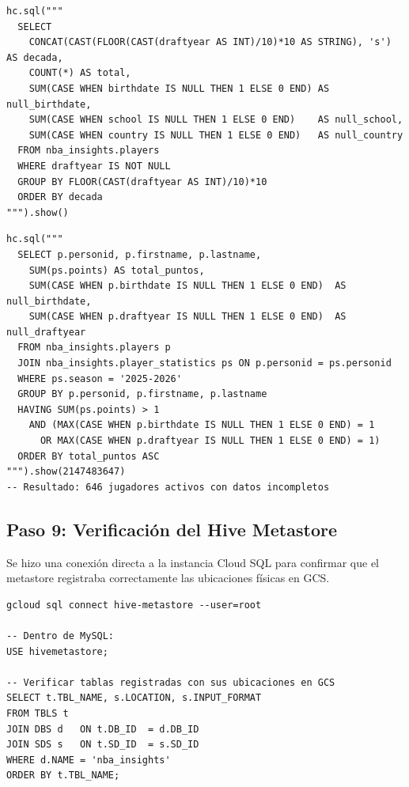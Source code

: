 \documentclass[12pt, letterpaper]{article}
\begin{document}
\begin{lstlisting}[style=codestyle, caption={Q5 --- Nulos por década de draft}]
hc.sql("""
  SELECT
    CONCAT(CAST(FLOOR(CAST(draftyear AS INT)/10)*10 AS STRING), 's') AS decada,
    COUNT(*) AS total,
    SUM(CASE WHEN birthdate IS NULL THEN 1 ELSE 0 END) AS null_birthdate,
    SUM(CASE WHEN school IS NULL THEN 1 ELSE 0 END)    AS null_school,
    SUM(CASE WHEN country IS NULL THEN 1 ELSE 0 END)   AS null_country
  FROM nba_insights.players
  WHERE draftyear IS NOT NULL
  GROUP BY FLOOR(CAST(draftyear AS INT)/10)*10
  ORDER BY decada
""").show()
\end{lstlisting}

\begin{lstlisting}[style=codestyle, caption={Q6 --- Jugadores activos 2025-26 con nulos y al menos 1 punto (query motivadora del enriquecimiento)}]
hc.sql("""
  SELECT p.personid, p.firstname, p.lastname,
    SUM(ps.points) AS total_puntos,
    SUM(CASE WHEN p.birthdate IS NULL THEN 1 ELSE 0 END)  AS null_birthdate,
    SUM(CASE WHEN p.draftyear IS NULL THEN 1 ELSE 0 END)  AS null_draftyear
  FROM nba_insights.players p
  JOIN nba_insights.player_statistics ps ON p.personid = ps.personid
  WHERE ps.season = '2025-2026'
  GROUP BY p.personid, p.firstname, p.lastname
  HAVING SUM(ps.points) > 1
    AND (MAX(CASE WHEN p.birthdate IS NULL THEN 1 ELSE 0 END) = 1
      OR MAX(CASE WHEN p.draftyear IS NULL THEN 1 ELSE 0 END) = 1)
  ORDER BY total_puntos ASC
""").show(2147483647)
-- Resultado: 646 jugadores activos con datos incompletos
\end{lstlisting}

\subsection{Paso 9: Verificación del Hive Metastore}

Se hizo una conexión directa a la instancia Cloud SQL para confirmar que el metastore registraba correctamente las ubicaciones físicas en GCS.

\begin{lstlisting}[style=codestyle, caption={Conexión a Cloud SQL y verificación del metastore}]
gcloud sql connect hive-metastore --user=root

-- Dentro de MySQL:
USE hivemetastore;

-- Verificar tablas registradas con sus ubicaciones en GCS
SELECT t.TBL_NAME, s.LOCATION, s.INPUT_FORMAT
FROM TBLS t
JOIN DBS d   ON t.DB_ID  = d.DB_ID
JOIN SDS s   ON t.SD_ID  = s.SD_ID
WHERE d.NAME = 'nba_insights'
ORDER BY t.TBL_NAME;
\end{lstlisting}
\end{document}
